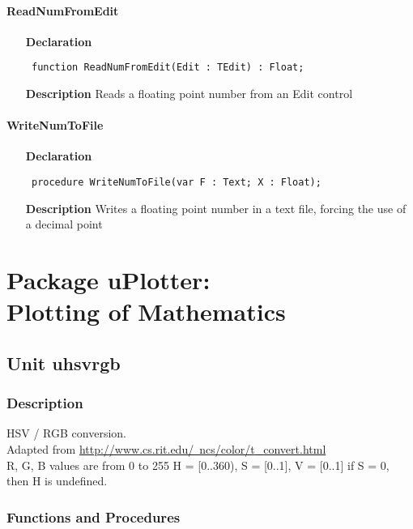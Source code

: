 \documentclass[12pt,a4paper,oneside]{report}
\newcommand{\declarationitem}[1]{\textbf{#1}}
\newcommand{\descriptiontitle}[1]{\textbf{#1}}
\newcommand{\code}[1]{\texttt{#1}}
\begin{document}
\subsubsection{ReadNumFromEdit}
\label{uwinstr-ReadNumFromEdit}
\begin{itemize}\item[\declarationitem{Declaration}\hfill]
	\begin{flushleft}
		\code{
			function ReadNumFromEdit(Edit : TEdit) : Float;}
		
	\end{flushleft}
	
	\par
	\item[\descriptiontitle{Description}]
	Reads a floating point number from an Edit control
	
\end{itemize}
\subsubsection{WriteNumToFile}
\label{uwinstr-WriteNumToFile}
\begin{itemize}\item[\declarationitem{Declaration}\hfill]
	\begin{flushleft}
		\code{
			procedure WriteNumToFile(var F : Text; X : Float);}
		
	\end{flushleft}
	
	\par
	\item[\descriptiontitle{Description}]
	Writes a floating point number in a text file, forcing the use of a decimal point
	
\end{itemize}
\chapter{Package uPlotter: \\ Plotting of Mathematics}\label{package-uplotter}
\section{Unit uhsvrgb}
\label{uhsvrgb}
\subsection{Description}
HSV / RGB conversion. \\ 
Adapted from \href{http://www.cs.rit.edu/~ncs/color/t_convert.html}{http://www.cs.rit.edu/~ncs/color/t{\_}convert.html} \\ R, G, B values are from 0 to 255 H = [0..360), S = [0..1], V = [0..1] if S = 0, then H is undefined. \subsection{Functions and Procedures}
\end{document}
